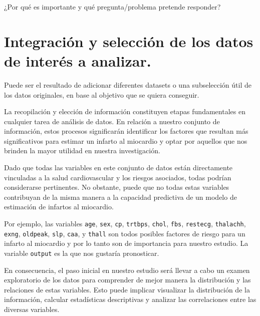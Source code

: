 \documentclass[
]{article}
\begin{document}
¿Por qué es importante y qué pregunta/problema pretende responder?

\hypertarget{integraciuxf3n-y-selecciuxf3n-de-los-datos-de-interuxe9s-a-analizar.}{%
\section{Integración y selección de los datos de interés a
analizar.}\label{integraciuxf3n-y-selecciuxf3n-de-los-datos-de-interuxe9s-a-analizar.}}

Puede ser el resultado de adicionar diferentes datasets o una
subselección útil de los datos originales, en base al objetivo que se
quiera conseguir.

La recopilación y elección de información constituyen etapas
fundamentales en cualquier tarea de análisis de datos. En relación a
nuestro conjunto de información, estos procesos significarán identificar
los factores que resultan más significativos para estimar un infarto al
miocardio y optar por aquellos que nos brinden la mayor utilidad en
nuestra investigación.

Dado que todas las variables en este conjunto de datos están
directamente vinculadas a la salud cardiovascular y los riesgos
asociados, todas podrían considerarse pertinentes. No obstante, puede
que no todas estas variables contribuyan de la misma manera a la
capacidad predictiva de un modelo de estimación de infartos al
miocardio.

Por ejemplo, las variables \texttt{age}, \texttt{sex}, \texttt{cp},
\texttt{trtbps}, \texttt{chol}, \texttt{fbs}, \texttt{restecg},
\texttt{thalachh}, \texttt{exng}, \texttt{oldpeak}, \texttt{slp},
\texttt{caa}, y \texttt{thall} son todos posibles factores de riesgo
para un infarto al miocardio y por lo tanto son de importancia para
nuestro estudio. La variable \texttt{output} es la que nos gustaría
pronosticar.

En consecuencia, el paso inicial en nuestro estudio será llevar a cabo
un examen exploratorio de los datos para comprender de mejor manera la
distribución y las relaciones de estas variables. Esto puede implicar
visualizar la distribución de la información, calcular estadísticas
descriptivas y analizar las correlaciones entre las diversas variables.
\end{document}
